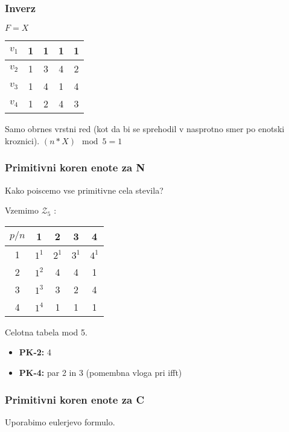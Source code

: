 \documentclass{article}
\begin{document}
\begin{multicols}{2}
\subsubsection{Inverz}
\begin{center}
    $F = X$
    \begin{tabular}{ |c|c|c|c|c| } 
        \hline
        $v_1$ &     1 & 1 & 1 & 1 \\ 
        \hline
        $v_2$ &     1 & 3 & 4 & 2\\  
        \hline
        $v_3$ &     1 & 4 & 1 & 4 \\
        \hline
        $v_4$ &     1 & 2 & 4 & 3 \\
        \hline
    \end{tabular}
\end{center}
Samo obrnes vrstni red (kot da bi se sprehodil v nasprotno smer po enotski kroznici).
$(n * X) \mod 5 = 1$
\subsubsection{Primitivni koren enote za N}
Kako poiscemo vse primitivne cela stevila?

Vzemimo  $\mathcal{Z}_5$ :
\begin{center}
    \begin{tabular}{ |c|c|c|c|c| } 
        \hline
        $p / n$ & 1 & 2 & 3 & 4 \\
        \hline
        1       & $1^1$ & $2^1$ & $3^1$ & $4^1$\\
        \hline
        2       & $1^2$ & 4 & 4 & 1 \\
        \hline
        3       & $1^3$ & 3 & 2 & 4 \\
        \hline
        4       & $1^4$ & 1 & 1 & 1 \\
        \hline
    \end{tabular}

Celotna tabela mod 5. 
\end{center}

\begin{itemize}
    \item \textbf{PK-2:} 4
    \item \textbf{PK-4:} par 2 in 3  (pomembna vloga pri ifft)
\end{itemize}

\subsubsection{Primitivni koren enote za C}
Uporabimo eulerjevo formulo.


\end{multicols}
\end{document}
